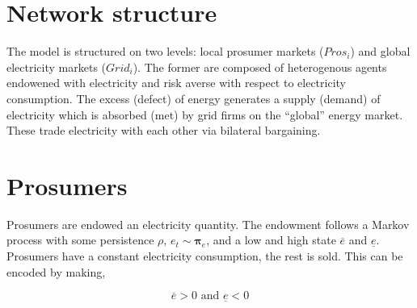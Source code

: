 \documentclass[american]{scrartcl}
\newcommand{\matr}[1]{\bm{#1}}
\begin{document}
\section{Network structure}

\begin{minipage}{0.45\textwidth}{
		}\end{minipage} \hfill
\begin{minipage}{0.5\textwidth}{
		The model is structured on two levels: local prosumer markets ($Pros_i$) and global electricity markets ($Grid_i$). The former are composed of heterogenous agents endowened with electricity and risk averse with respect to electricity consumption. The excess (defect) of energy generates a supply (demand) of electricity which is absorbed (met) by grid firms on the ``global'' energy market. These trade electricity with each other via bilateral bargaining.
	}
\end{minipage}

\newpage

\section{Prosumers}

Prosumers are endowed an electricity quantity. The endowment follows a Markov process with some persistence $\rho$, $e_t \sim \matr{\pi}_{e}$, and a low and high state $\overline{e}$ and $\underline{e}$. Prosumers have a constant electricity consumption, the rest is sold. This can be encoded by making,

\begin{equation}
	\overline{e} > 0 \text{ and } \underline{e} < 0
\end{equation}
\end{document}
